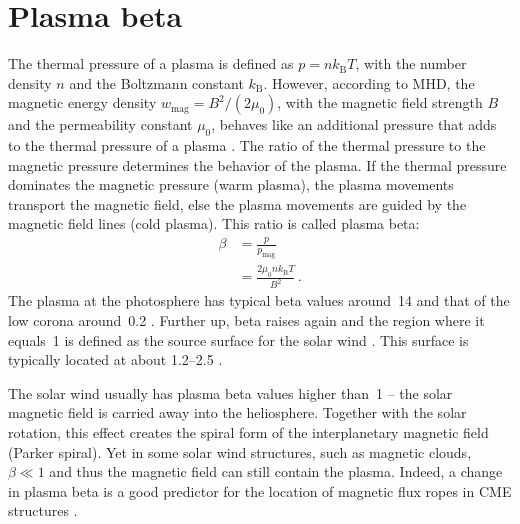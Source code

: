 \section{Plasma beta}
\label{sec:plasma_beta}
The thermal pressure of a plasma is defined as $p = n k_\text{B} T$, with the number density $n$ and the Boltzmann constant $k_\text{B}$. However, according to MHD, the magnetic energy density $w_\text{mag} = B^2 / (2 \mu_0)$, with the magnetic field strength $B$ and the permeability constant $\mu_0$, behaves like an additional pressure that adds to the thermal pressure of a plasma \citep[p.~50]{Kivelson1995}. The ratio of the thermal pressure to the magnetic pressure determines the behavior of the plasma. If the thermal pressure dominates the magnetic pressure (warm plasma), the plasma movements transport the magnetic field, else the plasma movements are guided by the magnetic field lines (cold plasma). This ratio is called plasma beta:
\begin{align}
	\beta &= \frac{p}{p_\text{mag}}\\
	&= \frac{2 \mu_0 n k_\text{B} T}{B^2}	\,.	\nonumber
\end{align}
The plasma at the photosphere has typical beta values around~14 and that of the low corona around~0.2 \citep{Gary2001}. Further up, beta raises again and the region where it equals~1 is defined as the source surface for the solar wind \citep{Schatten1969}.	%
This surface is typically located at about \SIrange{1.2}{2.5}{\Rs} \citep{Gary2001}.

The solar wind usually has plasma beta values higher than~1 -- the solar magnetic field is carried away into the heliosphere. Together with the solar rotation, this effect creates the spiral form of the interplanetary magnetic field (Parker spiral). Yet in some solar wind structures, such as magnetic clouds, $\beta \ll 1$ and thus the magnetic field can still contain the plasma. Indeed, a change in plasma beta is a good predictor for the location of magnetic flux ropes in CME structures \citep{Riley2013,Savani2013}.




